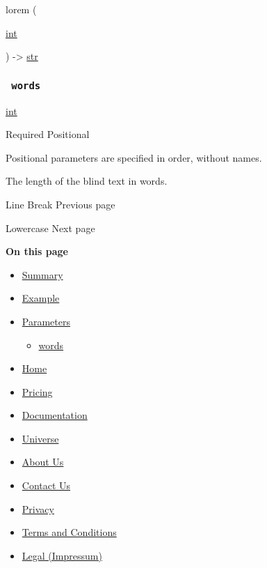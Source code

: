 { lorem } (

{ \href{/docs/reference/foundations/int/}{int} }

) -\textgreater{} \href{/docs/reference/foundations/str/}{str}

\subsubsection{\texorpdfstring{\texttt{\ words\ }}{ words }}\label{parameters-words}

\href{/docs/reference/foundations/int/}{int}

{Required} {{ Positional }}

\label{parameters-words-positional-tooltip}
Positional parameters are specified in order, without names.

The length of the blind text in words.

\href{/docs/reference/text/linebreak/}{\pandocbounded{}}

{ Line Break } { Previous page }

\href{/docs/reference/text/lower/}{\pandocbounded{}}

{ Lowercase } { Next page }

\textbf{On this page}

\begin{itemize}
\tightlist
\item
  \hyperref[summary]{Summary}
\item
  \hyperref[example]{Example}
\item
  \hyperref[parameters]{Parameters}

  \begin{itemize}
  \tightlist
  \item
    \hyperref[parameters-words]{words}
  \end{itemize}
\end{itemize}

\begin{itemize}
\tightlist
\item
  \href{/}{Home}
\item
  \href{/pricing/}{Pricing}
\item
  \href{/docs/}{Documentation}
\item
  \href{/universe/}{Universe}
\item
  \href{/about/}{About Us}
\item
  \href{/contact/}{Contact Us}
\item
  \href{/privacy/}{Privacy}
\item
  \href{https://typst.app/terms}{Terms and Conditions}
\item
  \href{/legal/}{Legal (Impressum)}
\end{itemize}

